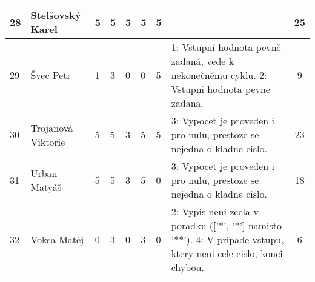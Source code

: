 \documentclass[landscape, 12pt]{article}
\begin{document}
\begin{longtable}{|l l | C{0.7cm} | C{0.7cm} | C{0.7cm} | C{0.7cm} | C{0.7cm} | L{15cm} |c|}
  28 & Stelšovský Karel   &       5 &       5 &       5 &       5 &       5 &                                                                                                                                                                                                                                                                                                                                                                                      &       25 \\
\hline

  29 & Švec Petr          &       1 &       3 &       0 &       0 &       5 & 1: Vstupní hodnota pevně zadaná, vede k nekonečnému cyklu. 2: Vstupni hodnota pevne zadana.                                                                                                                                                                                                                                                                                             &        9 \\
\hline

  30 & Trojanová Viktorie &       5 &       5 &       3 &       5 &       5 & 3: Vypocet je proveden i pro nulu, prestoze se nejedna o kladne cislo.                                                                                                                                                                                                                                                                                                                  &       23 \\
\hline

  31 & Urban Matyáš       &       5 &       5 &       3 &       5 &       0 & 3: Vypocet je proveden i pro nulu, prestoze se nejedna o kladne cislo.                                                                                                                                                                                                                                                                                                                  &       18 \\
\hline

  32 & Voksa Matěj        &       0 &       3 &       0 &       3 &       0 & 2: Vypis neni zcela v poradku (['*', '*'] namisto '**'). 4: V pripade vstupu, ktery neni cele cislo, konci chybou.                                                                                                                                                                                                                                                                            &        6 \\
\hline


\end{longtable}
\end{document}
